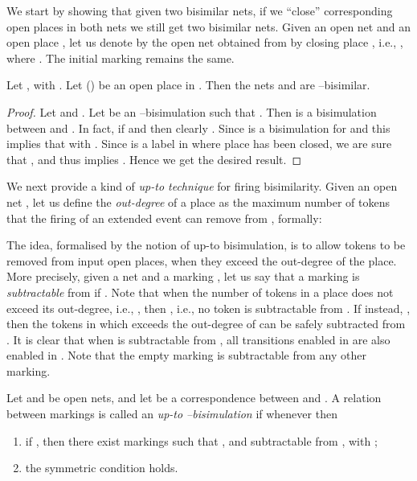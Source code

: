 \documentclass{LMCS}
\begin{document}
We start by showing that given two bisimilar nets, if we ``close'' 
corresponding open places in both nets we still get two bisimilar nets.
Given an open net  and an open place , let us denote
by  the open net obtained from  by closing place ,
i.e., , where .
The initial marking remains the same.

\begin{prop}
  \label{pr:closing}
  Let , with . Let  () be
  an open place in . Then the nets  and
   are --bisimilar.
\end{prop}


\begin{proof}
  Let  and . Let
   be an
  --bisimulation such that .
Then  is a bisimulation between  and
  .  In fact, if  and  then clearly . Since
   is a bisimulation for  and  this implies
  that  with . Since  is a label in  where place  has
  been closed, we are sure that , and thus  implies .
Hence we get the desired result.
\end{proof}





We next provide a kind of \emph{up-to technique} for firing
bisimilarity. Given an open net , let us define the
\emph{out-degree} of a place   as
the maximum number of tokens that the firing of an extended event
can remove from , formally: 

\begin{center}
   
\end{center}

The idea, formalised by the notion of up-to bisimulation, is to allow
tokens to be removed from input open places, when they exceed the
out-degree of the place. More precisely, given a net  and a marking
, let us say that a marking  is
\emph{subtractable} from  if . 
Note that when the number of tokens in a place  does not exceed its
out-degree, i.e., , then , i.e., no
token is subtractable from . If instead, , then
the tokens in  which exceeds the out-degree of  can be safely
subtracted from .
It is clear that when  is subtractable from , all transitions
enabled in  are also enabled in .
Note that the empty marking is subtractable from any other marking.

\begin{defi}
  \label{de:upto}
  Let  and  be open nets, and let  be a correspondence between  and .  A
  relation 
  between markings is called an \emph{up-to
    --bisimulation} if whenever  then

  \begin{enumerate}[]


  \item if , then there exist
    markings  such
    that , and 
    subtractable from ,
    with  ;
    
  \item the symmetric condition holds.

  \end{enumerate}
\end{defi}
\end{document}
